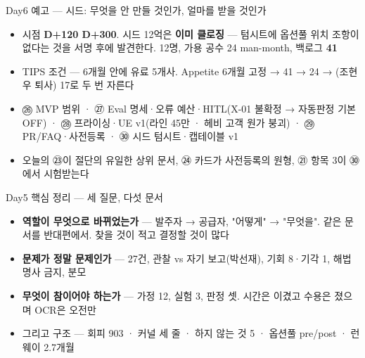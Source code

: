 \begin{frame}{Day6 예고 — 시드: 무엇을 안 만들 것인가, 얼마를 받을 것인가}
\begin{itemize}
\item 시점 \textbf{D+120 \til{} D+300}. 시드 12억은 \textbf{이미 클로징} — 텀시트에 옵션풀 위치 조항이 없다는 것을 서명 후에 발견한다. 12명, 가용 공수 24 man-month, 백로그 \textbf{41}
\item TIPS 조건 — 6개월 안에 유료 5개사. Appetite 6개월 고정 → 41 → 24 → (조현우 퇴사) 17로 두 번 자른다
\item ㉖ MVP 범위 · ㉗ Eval 명세·오류 예산·HITL(X-01 불확정 → 자동판정 기본 OFF) · ㉘ 프라이싱·UE v1(라인 45만 · 헤비 고객 원가 붕괴) · ㉙ PR/FAQ·사전등록 · ㉚ 시드 텀시트·캡테이블 v1
\item 오늘의 ㉓이 절단의 유일한 상위 문서, ㉔ 카드가 사전등록의 원형, ㉑ 항목 3이 ㉚에서 시험받는다
\end{itemize}
\end{frame}

\begin{frame}{Day5 핵심 정리 — 세 질문, 다섯 문서}
\begin{itemize}
\item \textbf{역할이 무엇으로 바뀌었는가} — 발주자 → 공급자, "어떻게" → "무엇을". 같은 문서를 반대편에서. 찾을 것이 적고 결정할 것이 많다
\item \textbf{문제가 정말 문제인가} — 27건, 관찰 vs 자기 보고(박선재), 기회 8·기각 1, 해법 명사 금지, 분모
\item \textbf{무엇이 참이어야 하는가} — 가정 12, 실험 3, 판정 셋. 시간은 이겼고 수용은 졌으며 OCR은 오전만
\item 그리고 구조 — 회피 903 · 커널 세 줄 · 하지 않는 것 5 · 옵션풀 pre/post · 런웨이 2.7개월
\end{itemize}
\end{frame}
